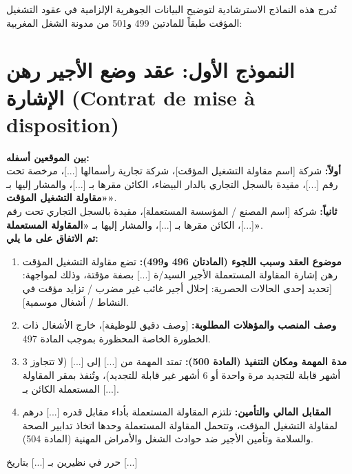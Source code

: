 تُدرج هذه النماذج الاسترشادية لتوضيح البيانات الجوهرية الإلزامية في عقود التشغيل المؤقت طبقاً للمادتين \textenglish{499} و\textenglish{501} من مدونة الشغل المغربية:

\section*{النموذج الأول: عقد وضع الأجير رهن الإشارة (\texorpdfstring{\textenglish{Contrat de mise à disposition}}{Contrat de mise à disposition})}
\begin{tcolorbox}[colback=white, colframe=sectioncolor, arc=4pt, title={\textbf{عقد وضع أجير رهن إشارة مقاولة مستعملة}}]
\small
\textbf{بين الموقعين أسفله:}\\
\textbf{أولاً:} شركة [اسم مقاولة التشغيل المؤقت]، شركة تجارية رأسمالها [...]، مرخصة تحت رقم [...]، مقيدة بالسجل التجاري بالدار البيضاء، الكائن مقرها بـ [...]، والمشار إليها بـ \textbf{«مقاولة التشغيل المؤقت»}.\\
\textbf{ثانياً:} شركة [اسم المصنع / المؤسسة المستعملة]، مقيدة بالسجل التجاري تحت رقم [...]، الكائن مقرها بـ [...]، والمشار إليها بـ \textbf{«المقاولة المستعملة»}.
\vspace{0.15cm}\\
\textbf{تم الاتفاق على ما يلي:}
\begin{enumerate}[itemsep=3pt]
    \item \textbf{موضوع العقد وسبب اللجوء (المادتان 496 و499):} تضع مقاولة التشغيل المؤقت رهن إشارة المقاولة المستعملة الأجير السيد/ة [...] بصفة مؤقتة، وذلك لمواجهة: [تحديد إحدى الحالات الحصرية: إحلال أجير غائب غير مضرب / تزايد مؤقت في النشاط / أشغال موسمية].
    \item \textbf{وصف المنصب والمؤهلات المطلوبة:} [وصف دقيق للوظيفة]، خارج الأشغال ذات الخطورة الخاصة المحظورة بموجب المادة \textenglish{497}.
    \item \textbf{مدة المهمة ومكان التنفيذ (المادة 500):} تمتد المهمة من [...] إلى [...] (لا تتجاوز \textenglish{3} أشهر قابلة للتجديد مرة واحدة أو \textenglish{6} أشهر غير قابلة للتجديد)، وتُنفذ بمقر المقاولة المستعملة الكائن بـ [...].
    \item \textbf{المقابل المالي والتأمين:} تلتزم المقاولة المستعملة بأداء مقابل قدره [...] درهم لمقاولة التشغيل المؤقت، وتتحمل المقاولة المستعملة وحدها اتخاذ تدابير الصحة والسلامة وتأمين الأجير ضد حوادث الشغل والأمراض المهنية (المادة \textenglish{504}).
\end{enumerate}
حرر في نظيرين بـ [...] بتاريخ [...]
\end{tcolorbox}

